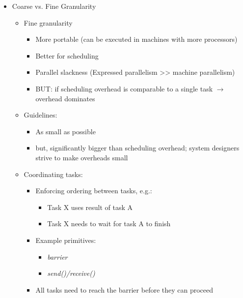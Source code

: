 \documentclass[a4paper]{article}
\begin{document}
\begin{itemize}
\begin{itemize}
\begin{itemize}
\begin{itemize}
\end{itemize}
\end{itemize}
\end{itemize}
\item Coarse vs. Fine Granularity
\begin{itemize}
\item Fine granularity
\begin{itemize}
\item More portable (can be executed in machines with more processors)
\item Better for scheduling 
\item Parallel slackness (Expressed parallelism >> machine parallelism)
\item BUT: if scheduling overhead is comparable to a single task $\to$ overhead dominates
\end{itemize}
\item Guidelines:
\begin{itemize}
\item As small as possible
\item but, significantly bigger than scheduling overhead; system designers strive to make overheads small
\end{itemize}
\item Coordinating tasks:
\begin{itemize}
\item Enforcing ordering between tasks, e.g.:
\begin{itemize}
\item Task X uses result of task A
\item Task X needs to wait for task A to finish
\end{itemize}
\item Example primitives:
\begin{itemize}
\item \emph{barrier}
\item \emph{send()/receive()}
\end{itemize}
\item All tasks need to reach the barrier before they can proceed
\end{itemize}
\end{itemize}
\end{itemize}
\end{document}
